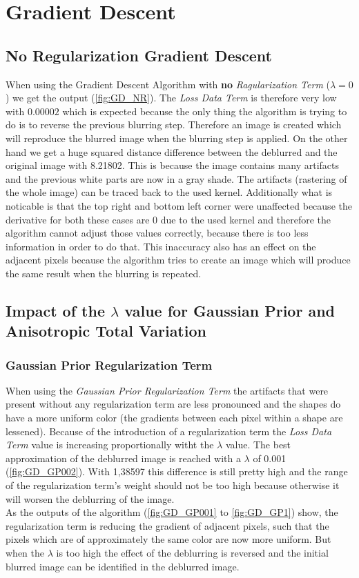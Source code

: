 \documentclass{report}
\begin{document}
	\section{Gradient Descent}
	\startsection
		\renewcommand{\thesubsection}{\thesection.\alph{subsection}}
		\subsection*{No Regularization Gradient Descent}
		\startsubsection
			When using the Gradient Descent Algorithm with \textbf{no} \textit{Ragularization Term} ($\lambda = 0$) we get the output (\ref{fig:GD_NR}). The \textit{Loss Data Term} is therefore very low with $0.00002$ which is expected because the only thing the algorithm is trying to do is to reverse the previous blurring step. Therefore an image is created which will reproduce the blurred image when the blurring step is applied. On the other hand we get a huge squared distance difference between the deblurred and the original image with 8.21802. This is because the image contains many artifacts and the previous white parts are now in a gray shade. The artifacts (rastering of the whole image) can be traced back to the used kernel. Additionally what is noticable is that the top right and bottom left corner were unaffected because the derivative for both these cases are 0 due to the used kernel and therefore the algorithm cannot adjust those values correctly, because there is too less information in order to do that. This inaccuracy also has an effect on the adjacent pixels because the algorithm tries to create an image which will produce the same result when the blurring is repeated.
		\closesection
		\subsection{Impact of the $\lambda$ value for Gaussian Prior and Anisotropic Total Variation}
		\startsubsection
			\subsubsection{Gaussian Prior Regularization Term}
			\startsubsection
				When using the \textit{Gaussian Prior Regularization Term} the artifacts that were present without any regularization term are less pronounced and the shapes do have a more uniform color (the gradients between each pixel within a shape are lessened). Because of the introduction of a regularization term the \textit{Loss Data Term} value is increasing proportionally witht the $\lambda$ value. The best approximation of the deblurred image is reached with a $\lambda$ of 0.001 (\ref{fig:GD_GP002}). With 1,38597 this difference is still pretty high and the range of the regularization term's weight should not be too high because otherwise it will worsen the deblurring of the image. \\
				As the outputs of the algorithm (\ref{fig:GD_GP001} to \ref{fig:GD_GP1}) show, the regularization term is reducing the gradient of adjacent pixels, such that the pixels which are of approximately the same color are now more uniform. But when the $\lambda$ is too high the effect of the deblurring is reversed and the initial blurred image can be identified in the deblurred image.
			\closesection
\end{document}
